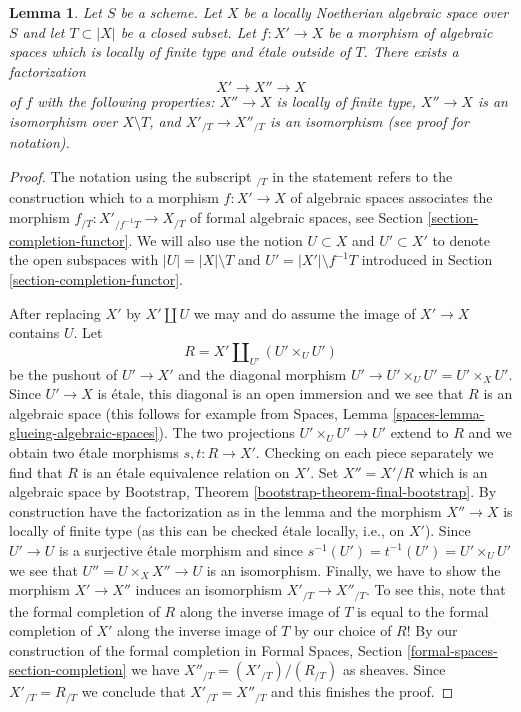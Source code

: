 \documentclass{stacks-project}
\theoremstyle{plain}
\newtheorem{lemma}[subsection]{Lemma}
\theoremstyle{definition}
\theoremstyle{remark}
\numberwithin{equation}{subsection}
\begin{document}
\begin{lemma}
\label{lemma-smash-away-from-T}
Let $S$ be a scheme. Let $X$ be a locally Noetherian algebraic space over $S$
and let $T \subset |X|$ be a closed subset. Let $f : X' \to X$ be a morphism
of algebraic spaces which is locally of finite type and \'etale outside of $T$.
There exists a factorization
$$
X' \longrightarrow X'' \longrightarrow X
$$
of $f$ with the following properties:
$X'' \to X$ is locally of finite type,
$X'' \to X$ is an isomorphism over $X \setminus T$, and
$X'_{/T} \to X''_{/T}$ is an isomorphism (see proof for notation).
\end{lemma}

\begin{proof}
The notation using the subscript ${}_{/T}$ in the statement refers to the
construction which to a morphism $f : X' \to X$ of algebraic spaces
associates the morphism $f_{/T} : X'_{/f^{-1}T} \to X_{/T}$ of formal
algebraic spaces, see Section \ref{section-completion-functor}.
We will also use the notion $U \subset X$ and $U' \subset X'$ to denote
the open subspaces with $|U| = |X| \setminus T$ and
$U' = |X'| \setminus f^{-1}T$ introduced in
Section \ref{section-completion-functor}.

\medskip\noindent
After replacing $X'$ by $X' \amalg U$ we may and do assume
the image of $X' \to X$ contains $U$.
Let
$$
R = X' \amalg_{U'} (U' \times_U U')
$$
be the pushout of $U' \to X'$ and the diagonal morphism
$U' \to U' \times_U U' = U' \times_X U'$. Since $U' \to X$ is \'etale,
this diagonal is an open immersion and we see that $R$ is an algebraic space
(this follows for example from
Spaces, Lemma \ref{spaces-lemma-glueing-algebraic-spaces}).
The two projections $U' \times_U U' \to U'$ extend to $R$
and we obtain two \'etale morphisms $s, t : R \to X'$.
Checking on each piece separately we find that $R$
is an \'etale equivalence relation on $X'$. Set $X'' = X'/R$
which is an algebraic space by
Bootstrap, Theorem \ref{bootstrap-theorem-final-bootstrap}.
By construction have the factorization as in the lemma and
the morphism $X'' \to X$ is locally of finite type (as this
can be checked \'etale locally, i.e., on $X'$).
Since $U' \to U$ is a surjective \'etale morphism
and since $s^{-1}(U') = t^{-1}(U') = U' \times_U U'$
we see that $U'' = U \times_X X'' \to U$ is an isomorphism.
Finally, we have to show the morphism $X' \to X''$ induces an isomorphism
$X'_{/T} \to X''_{/T}$. To see this, note that the formal completion of $R$
along the inverse image of $T$ is equal to the formal completion of
$X'$ along the inverse image of $T$ by our choice of $R$! By
our construction of the formal completion in
Formal Spaces, Section \ref{formal-spaces-section-completion}
we have $X''_{/T} = (X'_{/T}) / (R_{/T})$ as sheaves. Since
$X'_{/T} = R_{/T}$ we conclude that $X'_{/T} = X''_{/T}$
and this finishes the proof.
\end{proof}
\end{document}
